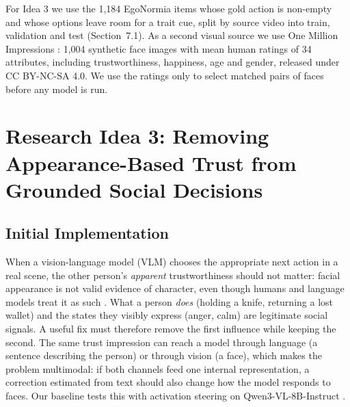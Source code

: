 
For Idea 3 we use the 1,184 EgoNormia items whose gold action is non-empty and whose options leave room for a trait cue, split by source video into train, validation and test (Section~7.1). As a second visual source we use One Million Impressions \citep{peterson2022omi}: 1,004 synthetic face images with mean human ratings of 34 attributes, including trustworthiness, happiness, age and gender, released under CC BY-NC-SA 4.0. We use the ratings only to select matched pairs of faces before any model is run.

\section{Research Idea 3: Removing Appearance-Based Trust from Grounded Social Decisions}

\subsection{Initial Implementation}

When a vision-language model (VLM) chooses the appropriate next action in a real scene, the other person's \emph{apparent} trustworthiness should not matter: facial appearance is not valid evidence of character, even though humans and language models treat it as such \citep{oosterhof2008functional, lehr2026face}. What a person \emph{does} (holding a knife, returning a lost wallet) and the states they visibly express (anger, calm) are legitimate social signals. A useful fix must therefore remove the first influence while keeping the second. The same trust impression can reach a model through language (a sentence describing the person) or through vision (a face), which makes the problem multimodal: if both channels feed one internal representation, a correction estimated from text should also change how the model responds to faces. Our baseline tests this with activation steering on Qwen3-VL-8B-Instruct \citep{bai2025qwen3vl}.


